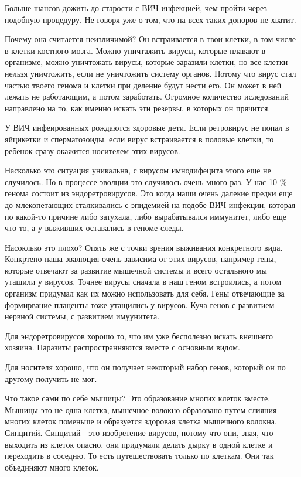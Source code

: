 Больше шансов дожить до старости с ВИЧ инфекцией, чем пройти через подобную процедуру.
Не говоря уже о том, что на всех таких доноров не хватит.

Почему она считается неизличимой? Он встраивается в твои клетки, в том
числе в клетки костного мозга. Можно уничтажить вирусы, которые плавают в организме,
можно уничтожать вирусы, которые заразили клетки, но все клетки нельзя уничтожить,
если не уничтожить систему органов. Потому что вирус стал частью твоего генома и
клетки при деление будут нести его. Он может в ней лежать не работающим,
а потом заработать. Огромное количество иследований направлено на то,
как именно искать эти резервы, в которых он прячится.

У ВИЧ инфеированных рождаются здоровые дети. Если ретровирус не попал в яйцикетки и сперматозоиды.
если вирус встраивается в половые клетки, то ребенок сразу окажится носителем этих
вирусов.

Насколько это ситуация уникальна, с вирусом имнодифецита этого еще не случилось. Но
в процессе эволции это случилось очень много раз. У нас 10 \%  генома 
состоит из эндоретровирусов. Это когда наши очень далекие предки еще до млекопетающих 
сталкивались с эпидемией на подобе ВИЧ инфекции, которая по какой-то причине либо затухала, 
либо вырабатывался иммунитет, либо еще что-то, а у выживших 
оставались в геноме следы. 

Насоклько это плохо?
Опять же с точки зрения выживания конкретного вида. Конкртено 
наша эвалюция очень зависима от этих вирусов, например гены, которые 
отвечают за развитие мышечной системы и всего остального мы утащили у вирусов. 
Точнее вирусы сначала в наш геном встроились, а потом организм придумал как их можно 
использовать для себя. Гены отвечающие за формирвание плаценты тоже 
утащились у вирусов. Куча генов с развитием нервной системы, 
с развитием имуунитета. 

Для эндоретровирусов хорошо то, что им уже бесполезно искать внешнего хозяина. 
Паразиты распространняются вместе с основным видом. 

Для носителя хорошо, что он получает некоторый набор генов,
который он по другому получить не мог. 

Что такое сами по себе мышицы? Это образование многих 
клеток вместе. Мышицы это не одна клетка, мышечное 
волокно образовано путем слияния многих клеток поменьше 
и образуется здоровая клетка мышечного волокна. Синцитий. 
Синцитий - это изобретение вирусов, потому что они, зная, 
что выходить из клеток опасно, они придумали делать 
дырку в одной клетке и переходить в соседню. То есть путешествовать только 
по клеткам. Они так объединяют много клеток. 


